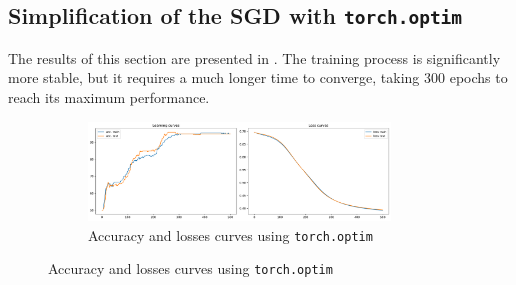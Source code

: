 \subsection{Simplification of the SGD with \texttt{torch.optim}}

The results of this section are presented in . The training process is significantly more stable, but it requires a much longer time to converge, taking 300 epochs to reach its maximum performance. 

\begin{figure}[H]
    \centering
    \begin{subfigure}{\textwidth}
        \centering
        \includegraphics[width=0.88\textwidth]{figs/NN/torchoptim_acc_loss.pdf}
        \caption{Accuracy and losses curves using \texttt{torch.optim}}
        \label{subfig:torchoptim_acc_loss}
    \end{subfigure}
\end{figure}

